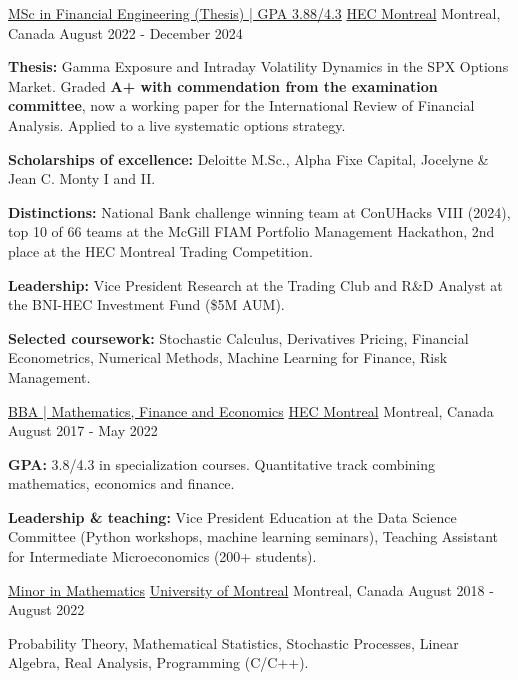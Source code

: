 \begin{cventries}
  \cventry
    {\href{https://www.hec.ca/en/programs/masters/master-financial-engineering}{MSc in Financial Engineering (Thesis) | GPA 3.88/4.3}}
    {\href{https://www.hec.ca/en}{HEC Montreal}}
    {Montreal, Canada}
    {August 2022 - December 2024}
    {
      \begin{cvitems}
        \item{\textbf{Thesis:} Gamma Exposure and Intraday Volatility Dynamics in the SPX Options Market. Graded \textbf{A+ with commendation from the examination committee}, now a working paper for the International Review of Financial Analysis. Applied to a live systematic options strategy.}
        \item{\textbf{Scholarships of excellence:} Deloitte M.Sc., Alpha Fixe Capital, Jocelyne \& Jean C. Monty I and II.}
        \item{\textbf{Distinctions:} National Bank challenge winning team at ConUHacks VIII (2024), top 10 of 66 teams at the McGill FIAM Portfolio Management Hackathon, 2nd place at the HEC Montreal Trading Competition.}
        \item{\textbf{Leadership:} Vice President Research at the Trading Club and R\&D Analyst at the BNI-HEC Investment Fund (\$5M AUM).}
        \item{\textbf{Selected coursework:} Stochastic Calculus, Derivatives Pricing, Financial Econometrics, Numerical Methods, Machine Learning for Finance, Risk Management.}
      \end{cvitems}
    }
  \cventry
    {\href{https://www.hec.ca/etudiants/mon-programme/baa/specialisations/economie-appliquee-finance-mathematiques.html}{BBA | Mathematics, Finance and Economics}}
    {\href{https://www.hec.ca/en}{HEC Montreal}}
    {Montreal, Canada}
    {August 2017 - May 2022}
    {
      \begin{cvitems}
        \item{\textbf{GPA:} 3.8/4.3 in specialization courses. Quantitative track combining mathematics, economics and finance.}
        \item{\textbf{Leadership \& teaching:} Vice President Education at the Data Science Committee (Python workshops, machine learning seminars), Teaching Assistant for Intermediate Microeconomics (200+ students).}
      \end{cvitems}
    }
  \cventry
    {\href{https://admission.umontreal.ca/programmes/mineure-en-mathematiques/}{Minor in Mathematics}}
    {\href{https://www.umontreal.ca/en/}{University of Montreal}}
    {Montreal, Canada}
    {August 2018 - August 2022}
    {
      \begin{cvitems}
        \item{Probability Theory, Mathematical Statistics, Stochastic Processes, Linear Algebra, Real Analysis, Programming (C/C++).}
      \end{cvitems}
    }
\end{cventries}
